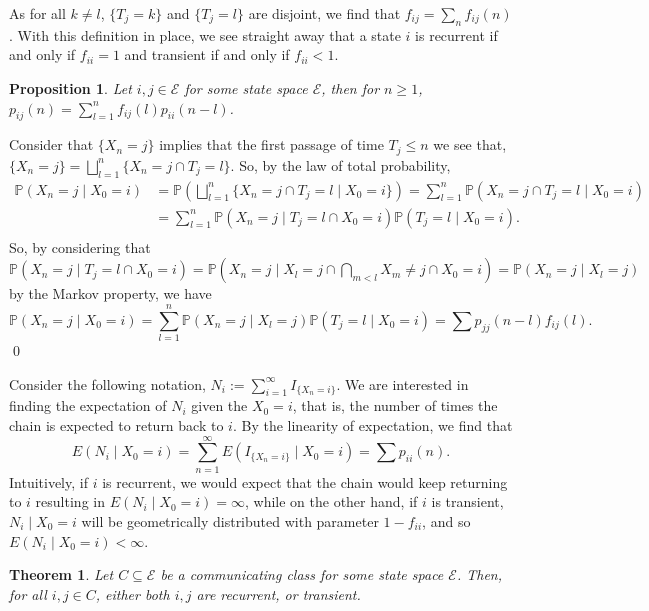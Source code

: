 \documentclass[
]{article}
\newtheorem{theorem}{Theorem}
\newtheorem{prop}{Proposition}[theorem]
\theoremstyle{definition}
\begin{document}
As for all \(k \neq l\), \(\{T_j = k\}\) and \(\{T_j = l\}\) are
disjoint, we find that \(f_{ij} = \sum_n f_{ij}(n)\). With this
definition in place, we see straight away that a state \(i\) is
recurrent if and only if \(f_{ii} = 1\) and transient if and only if
\(f_{ii} < 1\).

\begin{prop}
  Let \(i, j \in \mathcal{E}\) for some state space \(\mathcal{E}\), then 
  for \(n \ge 1\), \(p_{ij}(n) = \sum_{l = 1}^n f_{ij}(l) p_{ii}(n - l)\). 
\end{prop}
\proof

Consider that \(\{X_n = j\}\) implies that the first passage of time
\(T_j \le n\) we see that,
\(\{X_n = j\} = \bigsqcup_{l = 1}^n\{X_n = j \cap T_j = l\}\). So, by
the law of total probability, \begin{align*}
    \mathbb{P}(X_n = j \mid X_0 = i) & = 
      \mathbb{P}\left(\bigsqcup_{l = 1}^n \{X_n = j \cap T_j = l \mid X_0 = i\}\right)
      = \sum_{l = 1}^n \mathbb{P}(X_n = j \cap T_j = l \mid X_0 = i)\\
      & = \sum_{l = 1}^n \mathbb{P}(X_n = j \mid T_j = l \cap X_0 = i) \mathbb{P}(T_j = l \mid X_0 = i).\\
  \end{align*} So, by considering that
\(\mathbb{P}(X_n = j \mid T_j = l \cap X_0 = i) =  \mathbb{P}(X_n = j \mid X_l = j \cap \bigcap_{m < l} X_m \neq j \cap X_0 = i)  = \mathbb{P}(X_n = j \mid X_l = j)\)
by the Markov property, we have
\[\mathbb{P}(X_n = j \mid X_0 = i) = \sum_{l = 1}^n
    \mathbb{P}(X_n = j \mid X_l = j) 
    \mathbb{P}(T_j = l \mid X_0 = i) = \sum p_{jj}(n - l)f_{ij}(l).\]
\qed

Consider the following notation,
\(N_i := \sum_{i = 1}^\infty I_{\{X_n = i\}}\). We are interested in
finding the expectation of \(N_i\) given the \(X_0 = i\), that is, the
number of times the chain is expected to return back to \(i\). By the
linearity of expectation, we find that
\[E(N_i \mid X_0 = i) = \sum_{n = 1}^\infty E(I_{\{X_n = i\}} \mid X_0 = i) 
= \sum p_{ii}(n).\] Intuitively, if \(i\) is recurrent, we would expect
that the chain would keep returning to \(i\) resulting in
\(E(N_i \mid X_0 = i) = \infty\), while on the other hand, if \(i\) is
transient, \(N_i \mid X_0 = i\) will be geometrically distributed with
parameter \(1 - f_{ii}\), and so \(E(N_i \mid X_0 = i) < \infty\).

\begin{theorem}
  Let \(C \subseteq \mathcal{E}\) be a communicating class for some state space 
  \(\mathcal{E}\). Then, for all \(i, j \in C\), either both \(i, j\) are 
  recurrent, or transient.
\end{theorem}
\proof
\end{document}
